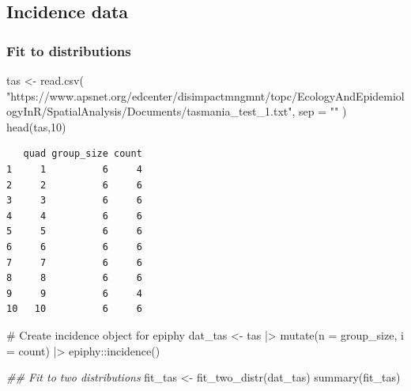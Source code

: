 \documentclass[
  letterpaper,
]{book}
\newenvironment{Shaded}{\begin{snugshade}}{\end{snugshade}}
\newcommand{\AttributeTok}[1]{\textcolor[rgb]{0.40,0.45,0.13}{#1}}
\newcommand{\CommentTok}[1]{\textcolor[rgb]{0.37,0.37,0.37}{#1}}
\newcommand{\DecValTok}[1]{\textcolor[rgb]{0.68,0.00,0.00}{#1}}
\newcommand{\DocumentationTok}[1]{\textcolor[rgb]{0.37,0.37,0.37}{\textit{#1}}}
\newcommand{\FunctionTok}[1]{\textcolor[rgb]{0.28,0.35,0.67}{#1}}
\newcommand{\NormalTok}[1]{\textcolor[rgb]{0.00,0.23,0.31}{#1}}
\newcommand{\OtherTok}[1]{\textcolor[rgb]{0.00,0.23,0.31}{#1}}
\newcommand{\SpecialCharTok}[1]{\textcolor[rgb]{0.37,0.37,0.37}{#1}}
\newcommand{\StringTok}[1]{\textcolor[rgb]{0.13,0.47,0.30}{#1}}
\begin{document}
\hypertarget{incidence-data-1}{%
\subsection{Incidence data}\label{incidence-data-1}}

\hypertarget{fit-to-distributions-1}{%
\subsubsection{Fit to distributions}\label{fit-to-distributions-1}}

\begin{Shaded}
\begin{Highlighting}[]
\NormalTok{tas }\OtherTok{\textless{}{-}}
  \FunctionTok{read.csv}\NormalTok{(}
    \StringTok{"https://www.apsnet.org/edcenter/disimpactmngmnt/topc/EcologyAndEpidemiologyInR/SpatialAnalysis/Documents/tasmania\_test\_1.txt"}\NormalTok{,}
    \AttributeTok{sep =} \StringTok{""}
\NormalTok{  )}
\FunctionTok{head}\NormalTok{(tas,}\DecValTok{10}\NormalTok{)}
\end{Highlighting}
\end{Shaded}

\begin{verbatim}
   quad group_size count
1     1          6     4
2     2          6     6
3     3          6     6
4     4          6     6
5     5          6     6
6     6          6     6
7     7          6     6
8     8          6     6
9     9          6     4
10   10          6     6
\end{verbatim}

\begin{Shaded}
\begin{Highlighting}[]
\CommentTok{\# Create incidence object for epiphy}
\NormalTok{dat\_tas }\OtherTok{\textless{}{-}}\NormalTok{ tas }\SpecialCharTok{|\textgreater{}}
  \FunctionTok{mutate}\NormalTok{(}\AttributeTok{n =}\NormalTok{ group\_size, }\AttributeTok{i =}\NormalTok{ count) }\SpecialCharTok{|\textgreater{}}
\NormalTok{  epiphy}\SpecialCharTok{::}\FunctionTok{incidence}\NormalTok{()}

\DocumentationTok{\#\# Fit to two distributions}
\NormalTok{fit\_tas }\OtherTok{\textless{}{-}} \FunctionTok{fit\_two\_distr}\NormalTok{(dat\_tas)}
\FunctionTok{summary}\NormalTok{(fit\_tas)}
\end{Highlighting}
\end{Shaded}
\end{document}
